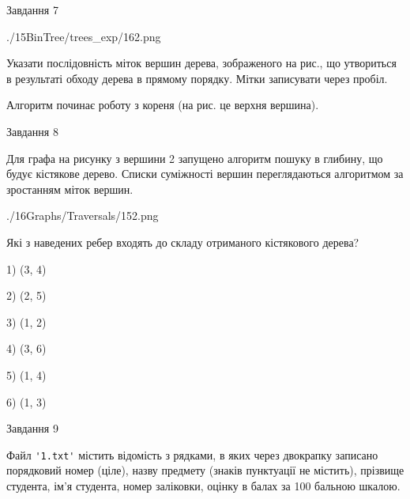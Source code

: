 \documentclass[12pt, ukrainian]{article}
\def\code#1{\Verb!#1!}
\begin{document}
{\vspace{10mm}\par

\newpage
\begin{minipage}[t]{9.7cm}
               
{\begin{center}Завдання {7}\end{center}}
\vspace{-6mm}

\begin{center}
	{./15BinTree/trees_exp/162.png}
\end{center}
Указати послідовність міток вершин дерева, зображеного на рис., що утвориться в результаті обходу дерева в прямому порядку. Мітки записувати через пробіл.\par Алгоритм починає роботу з кореня (на рис. це верхня вершина).\par

\end{minipage}
\vline \hspace{8mm}
\begin{minipage}[t]{8.0cm}
               
{\begin{center}Завдання {8}\end{center}}
\vspace{-6mm}
Для графа на рисунку з вершини 2 запущено алгоритм пошуку в глибину, що будує кістякове дерево. Списки суміжності вершин переглядаються алгоритмом за зростанням міток вершин.\par
\begin{center}
	{./16Graphs/Traversals/152.png}
\end{center}
\par Які з наведених ребер входять до складу отриманого кістякового дерева?\par
1) (3, 4)\par
2) (2, 5)\par
3) (1, 2)\par
4) (3, 6)\par
5) (1, 4)\par
6) (1, 3)\par
{\vskip 15pt} \par

\end{minipage}

               
{\begin{center}Завдання {9}\end{center}}
\vspace{-6mm}
Файл \code{'1.txt'} містить відомість з рядками, в яких через двокрапку записано поряд\-ковий номер (ціле), назву предмету (знаків пунктуації не містить), прізвище студента, ім'я студента, номер заліковки, оцінку в балах за 100 бальною шкалою.

}
\end{document}
